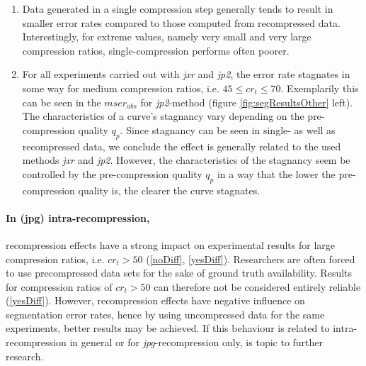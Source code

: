 \documentclass[10pt,twocolumn,letterpaper]{article}
\begin{document}
\begin{enumerate}
 \begin{enumerate}
 	 	\item Data generated in a single compression step generally tends to result in smaller error rates compared to those computed from recompressed data. Interestingly, for extreme values, namely very small and very large compression ratios, single-compression performs often poorer. \label{singleAmongBest}
 	 	
 	 	\item For all experiments carried out with \emph{jxr} and \emph{jp2}, the error rate stagnates in some way for medium compression ratios, i.e. $45 \leq cr_t \leq 70$. Exemplarily this can be seen in the $mser_{abs}$ for \emph{jp2}-method (figure \ref{fig:segResultsOther} left). The characteristics of a curve's stagnancy vary depending on the pre-compression quality $q_p$. Since stagnancy can be seen in single- as well as recompressed data, we conclude the effect is generally related to the used methods \emph{jxr} and \emph{jp2}. However, the characteristics of the stagnancy seem be controlled by the pre-compression quality $q_p$ in a way that the lower the pre-compression quality is, the clearer the curve stagnates. \label{cureFlattening}
\end{enumerate}  
  \end{enumerate}
 
\paragraph{In (jpg) intra-recompression,} recompression effects have a strong impact on experimental results for large compression ratios, i.e. $cr_t > 50$ (\ref{noDiff}, \ref{yesDiff}). Researchers are often forced to use precompressed data sets for the sake of ground truth availability. Results for compression ratios of $cr_t > 50$ can therefore not be considered entirely reliable (\ref{yesDiff}). However, recompression effects have negative influence on segmentation error rates, hence by using uncompressed data for the same experiments, better results may be achieved. If this behaviour is related to intra-recompression in general or for \emph{jpg}-recompression only, is topic to further research.
\end{document}
